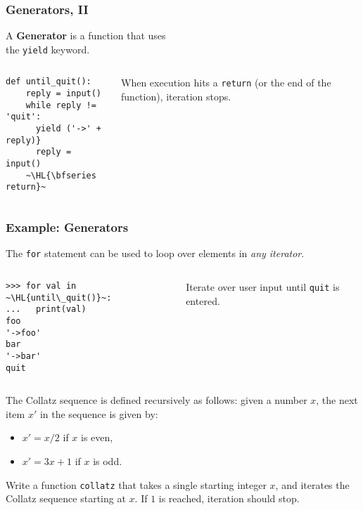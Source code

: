 \documentclass[english,serif,mathserif,xcolor=pdftex,dvipsnames,table]{beamer}
\begin{document}
\begin{frame}[fragile]
  \frametitle{Generators, II}
  A \textbf{Generator} is a function that uses \\ the \lstinline|yield| keyword.

  \+
  \begin{columns}[c]
    \begin{column}{0.5\textwidth}
\begin{lstlisting}
def until_quit():
    reply = input()
    while reply != 'quit':
      yield ('->' + reply)}
      reply = input()
    ~\HL{\bfseries return}~
\end{lstlisting}
    \end{column}
    \begin{column}{0.4\textwidth}
      \raggedleft
      When execution hits a \texttt{return}
      (or the end of the function),
      iteration stops.
    \end{column}
  \end{columns}
\end{frame}


\begin{frame}[fragile]
  \frametitle{Example: Generators}
  The \texttt{for} statement can be used to loop over elements in \emph{any iterator}.

  \+
  \begin{columns}[c]
    \begin{column}{0.5\textwidth}
\begin{lstlisting}
>>> for val in ~\HL{until\_quit()}~:
...   print(val)
foo
'->foo'
bar
'->bar'
quit
\end{lstlisting}
    \end{column}
    \begin{column}{0.4\textwidth}
      \raggedleft
      Iterate over user input until \texttt{quit} is entered.
    \end{column}
  \end{columns}
\end{frame}


\begin{frame}[fragile]
  \begin{exercise*}[3.F]
    The Collatz sequence is defined recursively as follows: given a
    number $x$, the next item $x'$ in the sequence is given by:
    \begin{itemize}
    \item $x' = x/2$ if $x$ is even,
    \item $x' = 3x + 1$ if $x$ is odd.
    \end{itemize}

    \+
    Write a function \texttt{collatz} that takes a single starting
    integer $x$, and iterates the Collatz sequence starting at $x$.
    If $1$ is reached, iteration should stop.
  \end{exercise*}
\end{frame}
\end{document}
